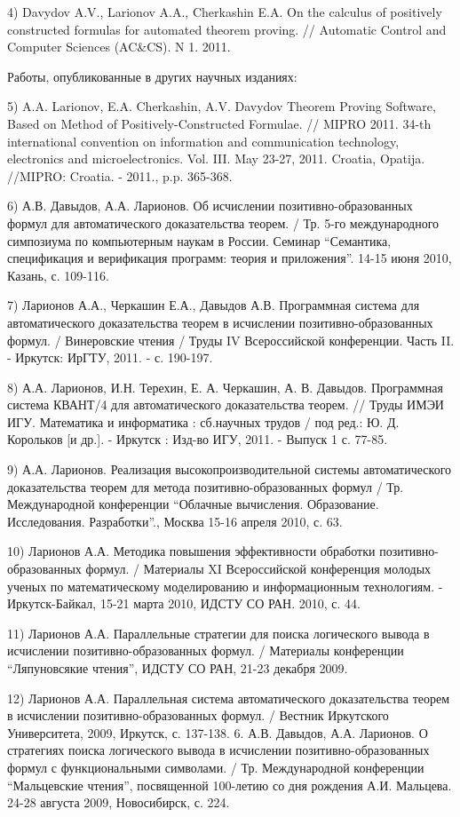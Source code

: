 \documentclass[a4paper]{report}
\begin{document}
4) Davydov A.V., Larionov A.A., Cherkashin E.A. On the calculus of
positively constructed formulas for automated theorem proving. //
Automatic Control and Computer Sciences (AC\&CS). N 1. 2011.

Работы, опубликованные в других научных изданиях:

5) A.A. Larionov, E.A. Cherkashin, A.V. Davydov Theorem Proving
Software, Based on Method of Positively-Constructed Formulae. // MIPRO
2011. 34-th international convention on information and communication
technology, electronics and microelectronics. Vol. III. May 23-27,
2011. Croatia, Opatija. //MIPRO: Croatia. - 2011., p.p. 365-368.

6) А.В. Давыдов, А.А. Ларионов. Об исчислении позитивно-образованных
формул для автоматического доказательства теорем. / Тр. 5-го
международного симпозиума по компьютерным наукам в России. Семинар
``Семантика, спецификация и верификация программ: теория и приложения''.
14-15 июня 2010, Казань, с. 109-116.

7) Ларионов А.А., Черкашин Е.А., Давыдов А.В. Программная система для
автоматического доказательства теорем в исчислении
позитивно-образованных формул. / Винеровские чтения / Труды IV
Всероссийской конференции. Часть II. - Иркутск: ИрГТУ, 2011. - с.
190-197.

8) А.А. Ларионов, И.Н. Терехин, Е. А. Черкашин, А. В. Давыдов.
Программная система КВАНТ/4 для автоматического доказательства теорем.
// Труды ИМЭИ ИГУ. Математика и информатика : сб.научных трудов / под
ред.: Ю. Д. Корольков [и др.]. - Иркутск : Изд-во ИГУ, 2011. - Выпуск
1 с. 77-85.

9) А.А. Ларионов. Реализация высокопроизводительной системы
автоматического доказательства теорем для метода
позитивно-образованных формул / Тр. Международной конференции
``Облачные вычисления. Образование. Исследования. Разработки''., Москва
15-16 апреля 2010,  с. 63.

10) Ларионов А.А. Методика повышения эффективности обработки
позитивно-образованных формул. / Материалы XI Всероссийской
конференция молодых ученых по математическому моделированию и
информационным технологиям. - Иркутск-Байкал, 15-21 марта 2010,  ИДСТУ
СО РАН.  2010, с. 44.

11) Ларионов А.А. Параллельные стратегии для поиска логического вывода
в исчислении позитивно-образованных формул. / Материалы конференции
``Ляпуновсякие чтения'', ИДСТУ СО РАН,  21-23 декабря 2009.

12) Ларионов А.А. Параллельная система автоматического доказательства
теорем в исчислении позитивно-образованных формул. / Вестник
Иркутского Университета, 2009, Иркутск, с. 137-138.
6. А.В. Давыдов, А.А. Ларионов. О стратегиях поиска логического вывода
в исчислении позитивно-образованных формул с функциональными
символами. / Тр. Международной конференции ``Мальцевские чтения'',
посвященной 100-летию со дня рождения А.И. Мальцева. 24-28 августа
2009, Новосибирск, с. 224.
\end{document}

